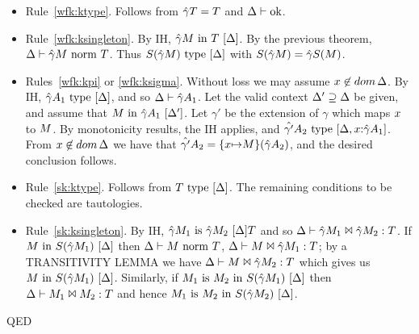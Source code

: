 \documentclass{article}
\newcommand{\qed}{\mbox{QED}}
\newcommand{\dom}{\mathop{dom}}
\newcommand{\env}{\gamma}
\newenvironment{proof}{\noindent{\bf Proof:}\hspace*{0.5em}}{\hspace*{\fill}\qed}
\theoremstyle{break}
\begin{document}
\iffalse
\begin{proof}
\begin{itemize}
\item Rule~\ref{wfk:ktype}.  Follows from $\hat\env\ktype = \ktype$ and 
${\Delta}\vdash\mbox{ok}$.
\item Rule~\ref{wfk:ksingleton}.  By IH, 
$\semanticvalidterm{\world}{\hat\env\constructor}{\ktype}$.  By the previous theorem,
$\normterm{\world}{\hat\env\constructor}{\ktype}$.  Thus 
$\semanticvalidtype{\world}{\ksingleton{\hat\env\constructor}}$ with
$\ksingleton{\hat\env\constructor} = \hat\env\ksingleton{\constructor}$.

\item Rules~\ref{wfk:kpi} or \ref{wfk:ksigma}.  Without loss we may
assume 
$\cvar\not\in\dom\world$.  
By IH, $\semanticvalidtype{\world}{\hat\env\kind_1}$, and so $\validkind{\world}{\hat\env\kind_1}$.
Let the valid context $\Delta'\supseteq\Delta$ be given, and assume that
$\semanticvalidterm{\world'}{\constructor}{\hat\env\kind_1}$.
Let $\env'$ be the extension of $\env$ which maps $x$ to $M$.
By monotonicity results, the IH applies, and 
$\semanticvalidtype{\world,\cvar{:}\hat\env\kind_1}{\hat{\env'}\kind_2}$.
From $\cvar\not\in\dom\world$ we have that 
$\hat{\env'}\kind_2 = \substitute{\cvar}{\constructor}{(\hat\env\kind_2)}$, 
and the desired conclusion follows.

\item Rule~\ref{sk:ktype}.  Follows from
${T}\mathrm{\ type\ }[\Delta]$.
The remaining conditions to be checked are tautologies.

\item Rule~\ref{sk:ksingleton}.  By IH,
$\semanticequivtype{\world}{\hat\env\constructor_1}{\hat\env\constructor_2}{\ktype}$
and so 
$\conequiv{\world}{\hat\env\constructor_1}{\hat\env\constructor_2}{\ktype}$.
If
$\semanticvalidterm{\world}{\constructor}{\ksingleton{\hat\env\constructor_1}}$
then
${\Delta}\vdash{M}\mbox{\ norm\ }{T}$,
$\conequiv{\world}{\constructor}{\hat\env\constructor_1}{\ktype}$;
by a TRANSITIVITY LEMMA we have
$\conequiv{\world}{\constructor}{\hat\env\constructor_2}{\ktype}$
which gives us
$\semanticvalidterm{\world}{\constructor}{\ksingleton{\hat\env\constructor_1}}$.
Similarly, if
$\semanticequivterm{\world}{\constructor_1}{\constructor_2}{\ksingleton{\hat\env\constructor_1}}$
then 
$\Delta\vdash M_1 \Join M_2 : T$ and hence
$\semanticequivterm{\world}{\constructor_1}{\constructor_2}{\ksingleton{\hat\env\constructor_2}}$.


\end{itemize}
\end{proof}
\end{document}
